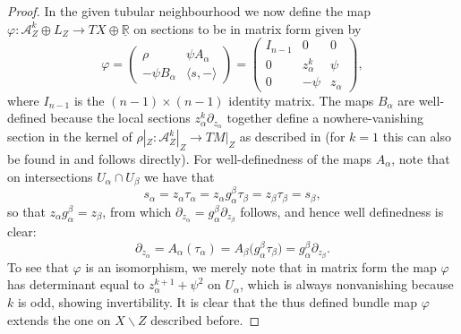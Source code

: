 \documentclass[10pt,a4paper]{amsart}
\numberwithin{equation}{section}
\begin{document}
\begin{proof}
In the given tubular neighbourhood we now define the map $\varphi\colon \mathcal{A}_Z^k \oplus L_Z \to TX \oplus \underline{\mathbb{R}}$ on sections to be in matrix form given by
\begin{displaymath}
	\varphi = \begin{pmatrix} \rho & \psi A_\alpha \\ -\psi B_\alpha & \langle s , - \rangle \end{pmatrix} = \begin{pmatrix} I_{n-1} & 0 & 0 \\ 0 & z_\alpha^k & \psi \\ 0 & -\psi & z_\alpha \end{pmatrix},
\end{displaymath}
where $I_{n-1}$ is the $(n-1) \times (n-1)$ identity matrix. The maps $B_\alpha$ are well-defined because the local sections $z_\alpha^k \partial_{z_\alpha}$ together define a nowhere-vanishing section in the kernel of $\rho|_Z\colon \mathcal{A}_Z^k|_Z \to TM|_Z$ as described in \cite[Proposition 2.3]{Scott16} (for $k = 1$ this can also be found in \cite{GuilleminMirandaPires14} and follows directly). For well-definedness of the maps $A_\alpha$, note that on intersections $U_\alpha \cap U_\beta$ we have that
\begin{displaymath}
	s_\alpha = z_\alpha \tau_\alpha = z_\alpha g_\alpha^\beta \tau_\beta = z_\beta \tau_\beta = s_\beta,
\end{displaymath}
so that $z_\alpha g_\alpha^\beta = z_\beta$, from which $\partial_{z_\alpha} = g_\alpha^\beta \partial_{z_\beta}$ follows, and hence well definedness is clear:
\begin{displaymath}
	\partial_{z_\alpha} = A_\alpha(\tau_\alpha) = A_\beta\big(g_\alpha^\beta \tau_\beta\big)= g_\alpha^\beta \partial_{z_\beta}.
\end{displaymath}
To see that $\varphi$ is an isomorphism, we merely note that in matrix form the map $\varphi$ has determinant equal to $z_\alpha^{k+1} + \psi^2$ on $U_\alpha$, which is always nonvanishing because $k$ is odd, showing invertibility. It is clear that the thus defined bundle map $\varphi$ extends the one on $X \backslash Z$ described before.


\end{proof}
\end{document}
